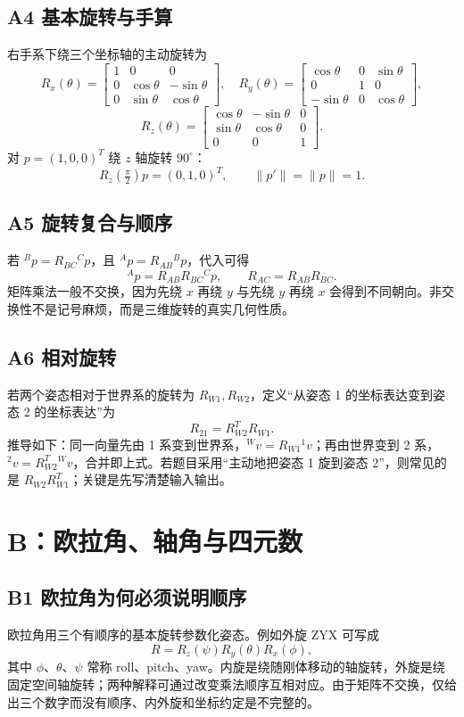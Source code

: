 \documentclass[UTF8,a4paper,11pt]{ctexart}
\begin{document}
\subsection{A4 基本旋转与手算}
右手系下绕三个坐标轴的主动旋转为
\[
R_x(\theta)=\begin{bmatrix}1&0&0\\0&\cos\theta&-\sin\theta\\0&\sin\theta&\cos\theta\end{bmatrix},\quad
R_y(\theta)=\begin{bmatrix}\cos\theta&0&\sin\theta\\0&1&0\\-\sin\theta&0&\cos\theta\end{bmatrix},
\]
\[
R_z(\theta)=\begin{bmatrix}\cos\theta&-\sin\theta&0\\\sin\theta&\cos\theta&0\\0&0&1\end{bmatrix}.
\]
对 $p=(1,0,0)^T$ 绕 $z$ 轴旋转 $90^\circ$：
\[
R_z(\tfrac\pi2)p=(0,1,0)^T,
\qquad \|p'\|=\|p\|=1.
\]

\subsection{A5 旋转复合与顺序}
若 ${}^B p=R_{BC}{}^C p$，且 ${}^A p=R_{AB}{}^B p$，代入可得
\[
{}^A p=R_{AB}R_{BC}{}^C p,
\qquad R_{AC}=R_{AB}R_{BC}.
\]
矩阵乘法一般不交换，因为先绕 $x$ 再绕 $y$ 与先绕 $y$ 再绕 $x$ 会得到不同朝向。非交换性不是记号麻烦，而是三维旋转的真实几何性质。

\subsection{A6 相对旋转}
若两个姿态相对于世界系的旋转为 $R_{W1},R_{W2}$，定义“从姿态 1 的坐标表达变到姿态 2 的坐标表达”为
\[
R_{21}=R_{W2}^TR_{W1}.
\]
推导如下：同一向量先由 1 系变到世界系，${}^Wv=R_{W1}{}^1v$；再由世界变到 2 系，${}^2v=R_{W2}^T{}^Wv$，合并即上式。若题目采用“主动地把姿态 1 旋到姿态 2”，则常见的是 $R_{W2}R_{W1}^T$；关键是先写清楚输入输出。

\section{B：欧拉角、轴角与四元数}
\subsection{B1 欧拉角为何必须说明顺序}
欧拉角用三个有顺序的基本旋转参数化姿态。例如外旋 ZYX 可写成
\[
R=R_z(\psi)R_y(\theta)R_x(\phi),
\]
其中 $\phi$、$\theta$、$\psi$ 常称 roll、pitch、yaw。内旋是绕随刚体移动的轴旋转，外旋是绕固定空间轴旋转；两种解释可通过改变乘法顺序互相对应。由于矩阵不交换，仅给出三个数字而没有顺序、内外旋和坐标约定是不完整的。
\end{document}
